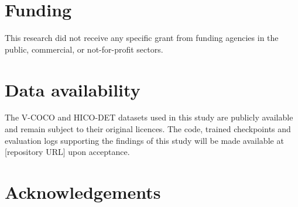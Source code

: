 \documentclass[12pt,a4paper]{article}
\begin{document}
\section*{Funding}
\noindent This research did not receive any specific grant from funding
agencies in the public, commercial, or not-for-profit sectors.

\section*{Data availability}
\noindent The V-COCO and HICO-DET datasets used in this study are publicly
available and remain subject to their original licences. The code, trained
checkpoints and evaluation logs supporting the findings of this study will be
made available at [repository URL] upon acceptance.

\section*{Acknowledgements}
\end{document}
